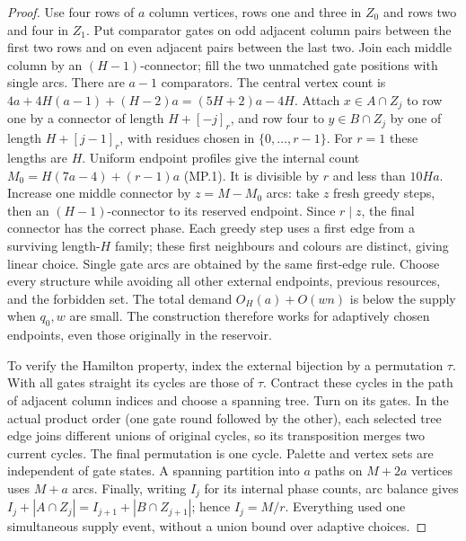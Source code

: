 \begin{proof}
Use four rows of $a$ column vertices, rows one and three in $Z_0$ and rows two and four in $Z_1$. Put comparator gates on odd adjacent column pairs between the first two rows and on even adjacent pairs
between the last two. Join each middle column by an $(H-1)$-connector; fill the two unmatched gate positions with single arcs. There are $a-1$ comparators. The central vertex count is $4a+4H(a-1)+(H-2)a=(5H+2)a-4H$. Attach $x\in{}A\cap{}Z_j$ to row one by a connector of length $H+[-j]_r$, and row four to $y\in{}B\cap{}Z_j$ by one of length $H+[j-1]_r$, with residues chosen in $\{0,\ldots,r-1\}$. For $r=1$ these lengths are $H$. Uniform endpoint profiles give the internal count $M_0=H(7a-4)+(r-1)a$ \textup{(MP.1)}. It is divisible by $r$ and less than $10Ha$. Increase one middle connector by $z=M-M_0$ arcs: take $z$ fresh greedy steps, then an $(H-1)$-connector to its reserved endpoint. Since $r\mid{}z$, the final connector has the correct phase. Each greedy step uses a first
edge from a surviving length-$H$ family; these first neighbours and colours are distinct, giving linear choice. Single gate arcs are
obtained by the same first-edge rule. Choose every structure while
avoiding all other external endpoints, previous resources, and the
forbidden set. The total demand $O_H(a)+O(wn)$ is below the supply when $q_0,w$ are small. The construction therefore works for adaptively chosen endpoints, even those originally in the reservoir.

To verify the Hamilton property, index the external bijection by a
permutation $\tau$. With all gates straight its cycles are those of $\tau$. Contract these cycles in the path of adjacent column indices and choose a spanning tree. Turn on its gates. In the actual product
order (one gate round followed by the other), each selected tree edge
joins different unions of original cycles, so its transposition merges
two current cycles. The final permutation is one cycle. Palette and
vertex sets are independent of gate states. A spanning partition into $a$ paths on $M+2a$ vertices uses $M+a$ arcs. Finally, writing $I_j$ for its internal phase counts, arc balance gives $I_j+|A\cap{}Z_j|=I_{j+1}+|B\cap{}Z_{j+1}|$; hence $I_j=M/r$. Everything used one simultaneous supply event, without a union bound
over adaptive choices.
\end{proof}

